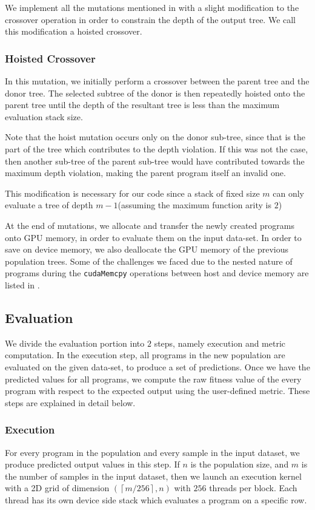We implement all the mutations mentioned in  with a slight modification to the crossover operation in order to constrain the depth of the output tree. We call this modification a hoisted crossover.  

\subsubsection{Hoisted Crossover}

In this mutation, we initially perform a crossover between the parent tree and the donor tree. The selected subtree of the donor is then repeatedly hoisted onto the parent tree until the depth of the resultant tree is less than the maximum evaluation stack size. 

Note that the hoist mutation occurs only on the donor sub-tree, since that is the part of the tree which contributes to the depth violation. If this was not the case, then another sub-tree of the parent sub-tree would have contributed towards the maximum depth violation, making the parent program itself an invalid one. 

This modification is necessary for our code since a stack of fixed size $m$ can only evaluate a tree of depth $m-1$(assuming the maximum function arity is $2$)

At the end of mutations, we allocate and transfer the newly created programs onto GPU memory, in order to evaluate them on the input data-set. In order to save on device memory, we also deallocate the GPU memory of the previous population trees. Some of the challenges we faced due to the nested nature of programs during the \lstinline!cudaMemcpy! operations between host and device memory are listed in . 

\subsection{Evaluation}
\label{ow:evaluation}
We divide the evaluation portion into $2$ steps, namely execution and metric computation. In the execution step, all programs in the new population are evaluated on the given data-set, to produce a set of predictions. Once we have the predicted values for all programs, we compute the raw fitness value of the every program with respect to the expected output using the user-defined metric. These steps are explained in detail below.  

\subsubsection{Execution}
\label{subsec:execute}
For every program in the population and every sample in the input dataset, we produce predicted output values in this step. If $n$ is the population size, and $m$ is the number of samples in the input dataset, then we launch an execution kernel with a 2D grid of dimension $(\left\lceil m/256\right\rceil ,n)$ with $256$ threads per block. Each thread has its own device side stack which evaluates a program on a specific row.

